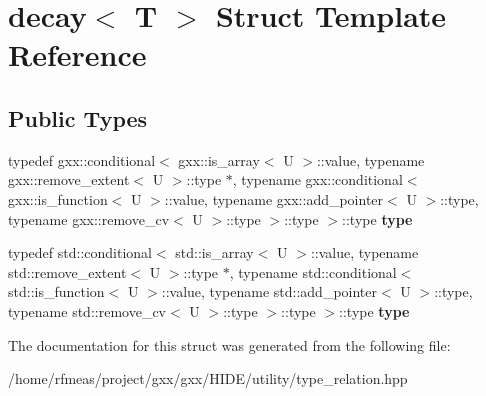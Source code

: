 \hypertarget{structdecay}{}\section{decay$<$ T $>$ Struct Template Reference}
\label{structdecay}
\subsection*{Public Types}
\begin{DoxyCompactItemize}
\item 
typedef gxx\+::conditional$<$ gxx\+::is\+\_\+array$<$ U $>$\+::value, typename gxx\+::remove\+\_\+extent$<$ U $>$\+::type $\ast$, typename gxx\+::conditional$<$ gxx\+::is\+\_\+function$<$ U $>$\+::value, typename gxx\+::add\+\_\+pointer$<$ U $>$\+::type, typename gxx\+::remove\+\_\+cv$<$ U $>$\+::type $>$\+::type $>$\+::type {\bfseries type}\hypertarget{structdecay_a4fdf85f3a145ca2be69b59a1dba61139}{}\label{structdecay_a4fdf85f3a145ca2be69b59a1dba61139}

\item 
typedef std\+::conditional$<$ std\+::is\+\_\+array$<$ U $>$\+::value, typename std\+::remove\+\_\+extent$<$ U $>$\+::type $\ast$, typename std\+::conditional$<$ std\+::is\+\_\+function$<$ U $>$\+::value, typename std\+::add\+\_\+pointer$<$ U $>$\+::type, typename std\+::remove\+\_\+cv$<$ U $>$\+::type $>$\+::type $>$\+::type {\bfseries type}\hypertarget{structdecay_ae011f354b41d8e173094d454939a1b5a}{}\label{structdecay_ae011f354b41d8e173094d454939a1b5a}

\end{DoxyCompactItemize}


The documentation for this struct was generated from the following file\+:\begin{DoxyCompactItemize}
\item 
/home/rfmeas/project/gxx/gxx/\+H\+I\+D\+E/utility/type\+\_\+relation.\+hpp\end{DoxyCompactItemize}
